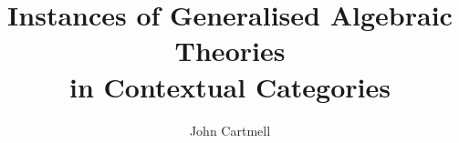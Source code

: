\documentclass[10pt,a4paper]{article}
\theoremstyle{remark}
\begin{document}
\title{Instances of Generalised Algebraic Theories\\in Contextual Categories}

\author{John Cartmell}

\maketitle



\newcommand{\gatU}{\gat[U]}
\newcommand{\gatUw}{\gatU\ }
\newcommand{\CofU}{\ccat[C](\gat[U])}
\newcommand{\KU}{K_{\gat[U]}}
\newcommand{\KUp}{K_{\gat[U']}}
\newcommand{\catCon}{\cat{Con}}
\newcommand{\catGAT}{\cat{GAT}}

\newcommand{\gatrule}[2]{$#1 \tstyle #2$}

\newcommand{\inlinedisplay}[1]
{
\setlength{\fboxsep}{1.5pt}
\setlength{\fboxrule}{0pt}
\fbox{$\displaystyle #1$}
}


\newcommand{\Isort}{I_{sort}}
\newcommand{\Iop}{I_{op}}
\newcommand {\Ihat}{\hat{I}}

\renewcommand{\crossx}[3]{#1 \underset{\tiny #3}{\cross} #2}
\newcommand{\fonestar}   {{f_1}\kern-.15em^*}
\newcommand{\ftwostar}   {{f_2}\kern-.15em^*}
\newcommand{\fjstar}     {{f_j}\kern-.2em^*}
\newcommand{\fjpstar}    {{f_{j-1}}\kern-.25em^*}
\newcommand{\smstar}{{s_m}\kern-.25em^*}
\newcommand{\sonestar}{{s_1}\kern-.15em^*}

\newcommand{\Trule} {T-rule\ }
\newcommand{\trule} {$\in$-rule\ }
\newcommand{\Trules} {T-rules\ }
\newcommand{\trules} {$\in$-rules\ }
\newcommand{\Teqrule} {T=-rule\ }
\newcommand{\teqrule} {$\in=$-rule\ }

\newcommand{\Imapsto}{\scaleto{\mapsto}{8pt}}

\newcommand{\gatinterpretationdetail}[5]{
\refstepcounter{equation}(\theequation)\label{#1}& \gatrule{#2}{#3}&$\mapsto$&&$#4$&#5}

\newcommand{\gatinterpretationintro}[5]{
\refstepcounter{equation}(\theequation)\label{#1}& \gatrule{#2}{#3}&$\mapsto$&&\cellcolor{lightergrey}$#4$&#5}

\newcommand{\gatinterpretationmapeqv}[2]{&&&=&\ \ $#1$&#2}
\newcommand{\gatinterpretationmapeqvsingle}[1]{&&&=&\multicolumn{2}{l}{\ \ $#1$}}
\end{document}

